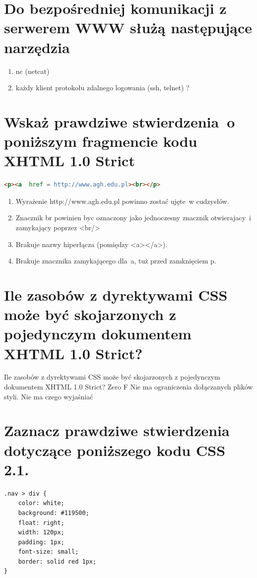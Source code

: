 \section{Do bezpośredniej komunikacji z serwerem WWW służą następujące narzędzia}

\vspace{0.4cm}
\noindent
 \begin{enumerate}
 \item{nc (netcat)} 
 \item{każdy klient protokołu zdalnego logowania (ssh, telnet) ?}
 \end{enumerate}
 
 
\section{Wskaż prawdziwe stwierdzenia~o poniższym fragmencie kodu XHTML 1.0 Strict}
\begin{lstlisting}[language=html]
	<p><a  href = http://www.agh.edu.pl><br></p>
\end{lstlisting}

\vspace{0.4cm}
\noindent
\begin{enumerate}
\item Wyrażenie  http://www.agh.edu.pl  powinno zostać ujęte~w cudzysłów.  
\item   Znacznik br powinien byc oznaczony jako jednoczesny znacznik otwierajacy~i zamykający poprzez <br/>
\item Brakuje nazwy hiperłącza (pomiędzy <a></a>).
\item Brakuje znacznika zamykającego dla~a, tuż przed zamknięciem p.
\end{enumerate}




\section{Ile zasobów z dyrektywami CSS może być skojarzonych z pojedynczym dokumentem XHTML 1.0 Strict?}
\answer
{Ile zasobów z dyrektywami CSS może być skojarzonych z pojedynczym dokumentem XHTML 1.0 Strict?}
{Zero}
{F}
{Nie ma ograniczenia dołączanych plików styli.}
{Nie ma czego wyjaśniać}

\section{Zaznacz prawdziwe stwierdzenia dotyczące poniższego kodu CSS 2.1.}
\begin{lstlisting}[language=html]
.nav > div {
	color: white;
	background: #119500;
	float: right;
	width: 120px;
	padding: 1px;
	font-size: small;
	border: solid red 1px;
}
\end{lstlisting}

